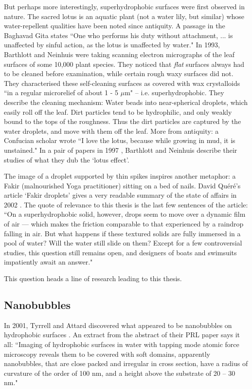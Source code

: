 \documentclass[12pt, a4paper, twoside, openright]{book}
\begin{document}
But perhaps more interestingly, superhydrophobic surfaces were first observed in nature. The sacred lotus is an aquatic plant (not a water lily, but similar) whose water-repellent qualities have been noted since antiquity.  A passage in the Baghavad Gita states ``One who performs his duty without attachment, ... is unaffected by sinful action, as the lotus is unaffected by water."
In 1993, Barthlott and Neinhuis were taking scanning electron micrographs of the leaf surfaces of some 10,000 plant species.  They noticed that \emph{flat} surfaces always had to be cleaned before examination, while certain rough waxy surfaces did not.  They characterised these self-cleaning surfaces as covered with wax crystalloids ``in a regular microrelief of about 1 - 5 $\mu$m" -- i.e. superhydrophobic.  They describe the cleaning mechanism: Water beads into near-spherical droplets, which easily roll off the leaf.  Dirt particles tend to be hydrophilic, and only weakly bound to the tops of the roughness.  Thus the dirt particles are captured by the water droplets, and move with them off the leaf.  More from antiquity: a Confucian scholar wrote ``I love the lotus, because while growing in mud, it is unstained." In a pair of papers in 1997 \cite{BarthlottNeinhuis1997,NeinhuisBarthlott1997}, Barthlott and Neinhuis describe their studies of what they dub the `lotus effect'.

The image of a droplet supported by thin spikes inspires another metaphor: a Fakir (malnourished Yoga practitioner) sitting on a bed of nails.  David Qu\'{e}r\'{e}'s article `Fakir droplets' gives a very readable summary of the state of affairs in 2002 \cite{Quere2002}.  The quote of relevance to this thesis is the last few sentences of the article: ``On a superhydrophobic solid, however, drops seem to move over a dynamic film of air --- which makes the friction comparable to that experienced by a raindrop falling in air.  But what happens if these textured solids are fully immersed in a pool of water? Will the water still slide on them?  Except for a few controversial studies, this question still remains open, and designers of boats and swimsuits impatiently await an answer."

This question heads a line of research leading to this thesis.


\subsection{Nanobubbles}

In 2001, Tyrrell and Attard discovered what appeared to be nanobubbles on hydrophobic surfaces \cite{TyrrellAttard2001}.  An extract from the abstract of their PRL paper says it all: ``Imaging of hydrophobic surfaces in water with tapping mode atomic force microscopy reveals them to be covered with soft domains, apparently nanobubbles, that are close packed and irregular in cross section, have a radius of curvature of the order of 100 nm, and a height above the substrate of 20 -- 30 nm."  
\end{document}
